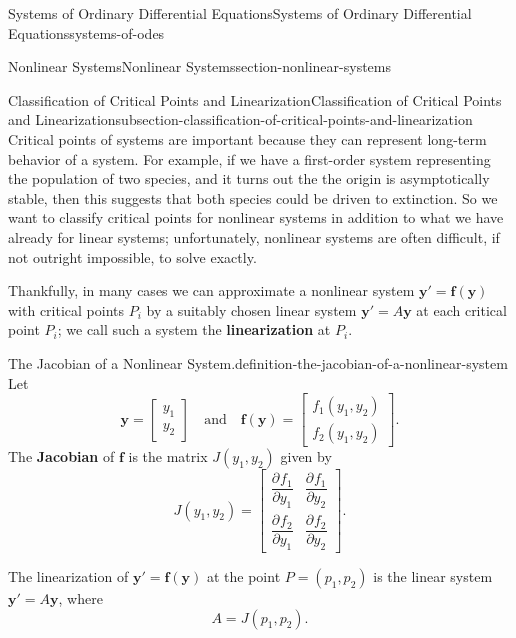\documentclass[oneside,10pt,]{book}
\newcommand{\terminology}[1]{\textbf{#1}}
\numberwithin{equation}{section}
\renewcommand{\vec}[1]{\mathbf{#1}}
\newcommand{\pdv}[3][]{\dfrac{\partial^{#1} #2}{\partial #3^{#1}}}
\newcommand{\amp}{&}
\begin{document}
\begin{chapterptx}{Systems of Ordinary Differential Equations}{}{Systems of Ordinary Differential Equations}{}{}{systems-of-odes}
\begin{sectionptx}{Nonlinear Systems}{}{Nonlinear Systems}{}{}{section-nonlinear-systems}
%
\begin{subsectionptx}{Classification of Critical Points and Linearization}{}{Classification of Critical Points and Linearization}{}{}{subsection-classification-of-critical-points-and-linearization}
\hypertarget{p-406}{}%
Critical points of systems are important because they can represent long-term behavior of a system. For example, if we have a first-order system representing the population of two species, and it turns out the the origin is asymptotically stable, then this suggests that both species could be driven to extinction. So we want to classify critical points for nonlinear systems in addition to what we have already for linear systems; unfortunately, nonlinear systems are often difficult, if not outright impossible, to solve exactly.%
\par
\hypertarget{p-407}{}%
Thankfully, in many cases we can approximate a nonlinear system \(\vec{y}' = \vec{f}(\vec{y})\) with critical points \(P_{i}\) by a suitably chosen linear system \(\vec{y}' = A\vec{y}\) at each critical point \(P_{i}\); we call such a system the \terminology{linearization} at \(P_{i}\).%
\begin{definition}{The Jacobian of a Nonlinear System.}{definition-the-jacobian-of-a-nonlinear-system}%
\hypertarget{p-408}{}%
Let%
\begin{equation*}
\vec{y} = \begin{bmatrix}y_{1} \\ y_{2}\end{bmatrix}\quad\text{and}\quad\vec{f}(\vec{y}) = \begin{bmatrix}f_{1}(y_{1},y_{2}) \\ f_{2}(y_{1},y_{2})\end{bmatrix}.
\end{equation*}
The \terminology{Jacobian} of \(\vec{f}\) is the matrix \(J(y_{1},y_{2})\) given by%
\begin{equation*}
J(y_{1},y_{2}) = \begin{bmatrix}\pdv{f_{1}}{y_{1}} \amp  \pdv{f_{1}}{y_{2}} \\ \pdv{f_{2}}{y_{1}} \amp  \pdv{f_{2}}{y_{2}}\end{bmatrix}.
\end{equation*}
%
\end{definition}
\hypertarget{p-409}{}%
The linearization of \(\vec{y}' = \vec{f}(\vec{y})\) at the point \(P = (p_{1},p_{2})\) is the linear system \(\vec{y}' = A\vec{y}\), where%
\begin{equation*}
A = J(p_{1},p_{2}).
\end{equation*}

\end{subsectionptx}
\end{sectionptx}
\end{chapterptx}
\end{document}
